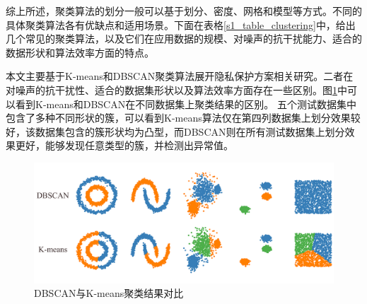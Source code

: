 综上所述，聚类算法的划分一般可以基于划分、密度、网格和模型等方式。不同的具体聚类算法各有优缺点和适用场景。下面在表格\ref{s1_table_clustering}中，给出几个常见的聚类算法，以及它们在应用数据的规模、对噪声的抗干扰能力、适合的数据形状和算法效率方面的特点。
\begin{table}[htbp]
	\centering
	\renewcommand{\arraystretch}{1.3}
	\caption{常见聚类算法比较}
	\label{s1_table_clustering}
\end{table}

本文主要基于K-means和DBSCAN聚类算法展开隐私保护方案相关研究。二者在对噪声的抗干扰性、适合的数据集形状以及算法效率方面存在一些区别。图\ref{clu_difference}中可以看到K-means和DBSCAN在不同数据集上聚类结果的区别。
五个测试数据集中包含了多种不同形状的簇，可以看到K-means算法仅在第四列数据集上划分效果较好，该数据集包含的簇形状均为凸型，而DBSCAN则在所有测试数据集上划分效果更好，能够发现任意类型的簇，并检测出异常值。


\begin{figure}[htbp]
	\centering
	\includegraphics[width=\linewidth]{img/difference.png}
	\caption{DBSCAN与K-means聚类结果对比}
	\label{clu_difference}
\end{figure}

